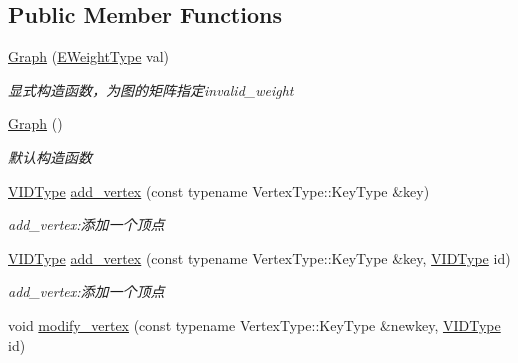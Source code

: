 \subsection*{Public Member Functions}
\begin{DoxyCompactItemize}
\item 
\hyperlink{struct_introduction_to_algorithm_1_1_graph_algorithm_1_1_graph_a1effb22f7cc51898e54bbb3a5f549c95}{Graph} (\hyperlink{struct_introduction_to_algorithm_1_1_graph_algorithm_1_1_graph_a77f6d3ef31203e0d6ebd2ed87928978a}{E\+Weight\+Type} val)
\begin{DoxyCompactList}\small\item\em 显式构造函数，为图的矩阵指定{\ttfamily invalid\+\_\+weight} \end{DoxyCompactList}\item 
\hyperlink{struct_introduction_to_algorithm_1_1_graph_algorithm_1_1_graph_a554fe807fb375fe4e56e5b0a0ac21477}{Graph} ()
\begin{DoxyCompactList}\small\item\em 默认构造函数 \end{DoxyCompactList}\item 
\hyperlink{struct_introduction_to_algorithm_1_1_graph_algorithm_1_1_graph_a507632614d13e91d29acbf8acb0b0f0f}{V\+I\+D\+Type} \hyperlink{struct_introduction_to_algorithm_1_1_graph_algorithm_1_1_graph_a172f460e7f689fa42dcb3f1130d3fa64}{add\+\_\+vertex} (const typename Vertex\+Type\+::\+Key\+Type \&key)
\begin{DoxyCompactList}\small\item\em add\+\_\+vertex\+:添加一个顶点 \end{DoxyCompactList}\item 
\hyperlink{struct_introduction_to_algorithm_1_1_graph_algorithm_1_1_graph_a507632614d13e91d29acbf8acb0b0f0f}{V\+I\+D\+Type} \hyperlink{struct_introduction_to_algorithm_1_1_graph_algorithm_1_1_graph_ad22898c16f9f614c0826bd62500317de}{add\+\_\+vertex} (const typename Vertex\+Type\+::\+Key\+Type \&key, \hyperlink{struct_introduction_to_algorithm_1_1_graph_algorithm_1_1_graph_a507632614d13e91d29acbf8acb0b0f0f}{V\+I\+D\+Type} id)
\begin{DoxyCompactList}\small\item\em add\+\_\+vertex\+:添加一个顶点 \end{DoxyCompactList}\item 
void \hyperlink{struct_introduction_to_algorithm_1_1_graph_algorithm_1_1_graph_ae36e2ef188da844f75a673516a6c7225}{modify\+\_\+vertex} (const typename Vertex\+Type\+::\+Key\+Type \&newkey, \hyperlink{struct_introduction_to_algorithm_1_1_graph_algorithm_1_1_graph_a507632614d13e91d29acbf8acb0b0f0f}{V\+I\+D\+Type} id)

\end{DoxyCompactItemize}
